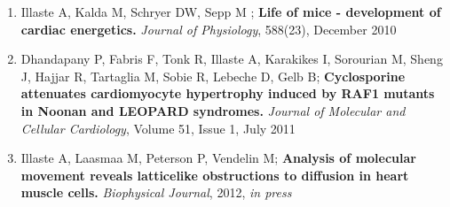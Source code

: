     \begin{enumerate}
    \item[\PaperNumI ] Illaste A, Kalda M, Schryer DW, Sepp M ; {\bf Life of mice - development of
  cardiac energetics.} \emph{Journal of Physiology}, 588(23), December 2010

    \item[\PaperNumII ] Dhandapany P, Fabris F, Tonk R, Illaste A,
        Karakikes I, Sorourian M, Sheng J, Hajjar R, Tartaglia M, Sobie
        R, Lebeche D,  Gelb B; {\bf Cyclosporine attenuates
        cardiomyocyte hypertrophy induced by RAF1 mutants in Noonan and
        LEOPARD syndromes.} \emph{Journal of Molecular and Cellular Cardiology}, Volume 51, Issue 1, July 2011
    \item[\PaperNumIII ] Illaste A, Laasmaa M, Peterson P, Vendelin M;
        {\bf Analysis of molecular movement reveals latticelike
        obstructions to diffusion in heart mus\-cle cells. } \emph{Biophysical Journal}, 2012, \emph{in press}

    \end{enumerate}
